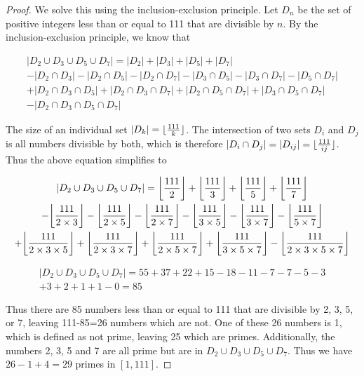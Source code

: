 \documentclass[12pt]{article}
\DeclarePairedDelimiter\floor{\lfloor}{\rfloor}
\begin{document}
\begin{proof}
We solve this using the inclusion-exclusion principle. Let $D_n$ be the set of positive integers less than or equal to 111 that are divisible by $n$. By the inclusion-exclusion principle, we know that 

\newcommand{\dlist}[1]{D_{#1}}
\begin{multline*}
    |\dlist{2} \cup \dlist{3} \cup \dlist{5} \cup \dlist{7}| = |\dlist{2}| + |\dlist{3}| + |\dlist{5}| + |\dlist{7}|\\ 
    -|\dlist{2} \cap \dlist{3}| - |\dlist{2} \cap \dlist{5}| - |\dlist{2} \cap \dlist{7}| - |\dlist{3} \cap \dlist{5}| - |\dlist{3} \cap \dlist{7}| - |\dlist{5} \cap \dlist{7}|\\
    +|\dlist{2} \cap \dlist{3} \cap \dlist{5}| + |\dlist{2} \cap \dlist{3} \cap \dlist{7}| + |\dlist{2} \cap \dlist{5} \cap \dlist{7}| + |\dlist{3} \cap \dlist{5} \cap \dlist{7}|\\
    -|\dlist{2} \cap \dlist{3} \cap \dlist{5} \cap \dlist{7}|
\end{multline*}

The size of an individual set $|D_k| = \floor{\frac{111}{k}}$. The intersection of two sets $D_i$ and $D_j$ is all numbers divisible by both, which is therefore $|D_i \cap D_j| = |D_{ij}| = \floor{\frac{111}{ij}}$. Thus the above equation simplifies to 

\newcommand{\dfloor}[1]{\floor*{\frac{111}{#1}}}
\begin{multline*}
    |\dlist{2} \cup \dlist{3} \cup \dlist{5} \cup \dlist{7}| = \dfloor{2} + \dfloor{3} + \dfloor{5} + \dfloor{7}\\ 
    -\dfloor{2\times3} - \dfloor{2\times5} - \dfloor{2\times7} - \dfloor{3\times5} - \dfloor{3\times7} - \dfloor{5\times7}\\
    +\dfloor{2\times3\times5} + \dfloor{2\times3\times7} + \dfloor{2\times5\times7} + \dfloor{3\times5\times7} -\dfloor{2\times3\times5\times7}
\end{multline*}

\begin{multline*}
    |\dlist{2} \cup \dlist{3} \cup \dlist{5} \cup \dlist{7}| = 55 + 37 + 22 + 15 - 18 - 11 - 7 - 7 - 5 - 3\\
    +3 + 2 + 1 + 1 - 0 = 85
\end{multline*}

Thus there are 85 numbers less than or equal to 111 that are divisible by 2, 3, 5, or 7, leaving 111-85=26 numbers which are not. One of these 26 numbers is 1, which is defined as not prime, leaving 25 which are primes. Additionally, the numbers 2, 3, 5 and 7 are all prime but are in $\dlist{2} \cup \dlist{3} \cup \dlist{5} \cup \dlist{7}$. Thus we have $26-1+4 = 29$ primes in $[1, 111]$.
\end{proof}
\end{document}
